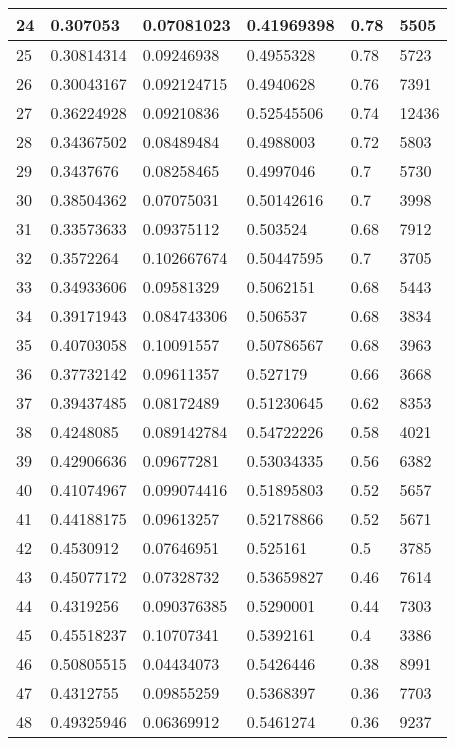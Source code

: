 \begin{longtable}{|l|l|l|l|l|l|}
24 & 0.307053 & 0.07081023 & 0.41969398 & 0.78 & 5505 \\ \hline 
25 & 0.30814314 & 0.09246938 & 0.4955328 & 0.78 & 5723 \\ \hline 
26 & 0.30043167 & 0.092124715 & 0.4940628 & 0.76 & 7391 \\ \hline 
27 & 0.36224928 & 0.09210836 & 0.52545506 & 0.74 & 12436 \\ \hline 
28 & 0.34367502 & 0.08489484 & 0.4988003 & 0.72 & 5803 \\ \hline 
29 & 0.3437676 & 0.08258465 & 0.4997046 & 0.7 & 5730 \\ \hline 
30 & 0.38504362 & 0.07075031 & 0.50142616 & 0.7 & 3998 \\ \hline 
31 & 0.33573633 & 0.09375112 & 0.503524 & 0.68 & 7912 \\ \hline 
32 & 0.3572264 & 0.102667674 & 0.50447595 & 0.7 & 3705 \\ \hline 
33 & 0.34933606 & 0.09581329 & 0.5062151 & 0.68 & 5443 \\ \hline 
34 & 0.39171943 & 0.084743306 & 0.506537 & 0.68 & 3834 \\ \hline 
35 & 0.40703058 & 0.10091557 & 0.50786567 & 0.68 & 3963 \\ \hline 
36 & 0.37732142 & 0.09611357 & 0.527179 & 0.66 & 3668 \\ \hline 
37 & 0.39437485 & 0.08172489 & 0.51230645 & 0.62 & 8353 \\ \hline 
38 & 0.4248085 & 0.089142784 & 0.54722226 & 0.58 & 4021 \\ \hline 
39 & 0.42906636 & 0.09677281 & 0.53034335 & 0.56 & 6382 \\ \hline 
40 & 0.41074967 & 0.099074416 & 0.51895803 & 0.52 & 5657 \\ \hline 
41 & 0.44188175 & 0.09613257 & 0.52178866 & 0.52 & 5671 \\ \hline 
42 & 0.4530912 & 0.07646951 & 0.525161 & 0.5 & 3785 \\ \hline 
43 & 0.45077172 & 0.07328732 & 0.53659827 & 0.46 & 7614 \\ \hline 
44 & 0.4319256 & 0.090376385 & 0.5290001 & 0.44 & 7303 \\ \hline 
45 & 0.45518237 & 0.10707341 & 0.5392161 & 0.4 & 3386 \\ \hline 
46 & 0.50805515 & 0.04434073 & 0.5426446 & 0.38 & 8991 \\ \hline 
47 & 0.4312755 & 0.09855259 & 0.5368397 & 0.36 & 7703 \\ \hline 
48 & 0.49325946 & 0.06369912 & 0.5461274 & 0.36 & 9237 \\ \hline 

\end{longtable}
